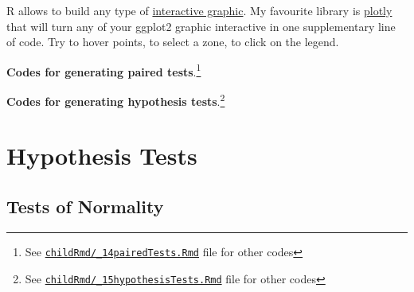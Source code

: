 \documentclass[
]{article}
\newenvironment{Shaded}{\begin{snugshade}}{\end{snugshade}}
\newcommand{\DataTypeTok}[1]{\textcolor[rgb]{0.00,0.34,0.68}{#1}}
\newcommand{\DecValTok}[1]{\textcolor[rgb]{0.69,0.50,0.00}{#1}}
\newcommand{\KeywordTok}[1]{\textcolor[rgb]{0.12,0.11,0.11}{\textbf{#1}}}
\newcommand{\NormalTok}[1]{\textcolor[rgb]{0.12,0.11,0.11}{#1}}
\newcommand{\OperatorTok}[1]{\textcolor[rgb]{0.12,0.11,0.11}{#1}}
\newcommand{\StringTok}[1]{\textcolor[rgb]{0.75,0.01,0.01}{#1}}
\begin{document}
R allows to build any type of
\href{https://www.r-graph-gallery.com/interactive-charts/}{interactive
graphic}. My favourite library is
\href{https://www.r-graph-gallery.com/get-the-best-from-ggplotly/}{plotly}
that will turn any of your ggplot2 graphic interactive in one
supplementary line of code. Try to hover points, to select a zone, to
click on the legend.

\begin{Shaded}
\end{Shaded}

\textbf{Codes for generating paired tests}.\footnote{See
  \href{https://github.com/sbalci/histopathology-template/blob/master/childRmd/_14pairedTests.Rmd}{\texttt{childRmd/\_14pairedTests.Rmd}}
  file for other codes}

\textbf{Codes for generating hypothesis tests}.\footnote{See
  \href{https://github.com/sbalci/histopathology-template/blob/master/childRmd/_15hypothesisTests.Rmd}{\texttt{childRmd/\_15hypothesisTests.Rmd}}
  file for other codes}

\hypertarget{hypothesis-tests}{%
\section{Hypothesis Tests}\label{hypothesis-tests}}

\hypertarget{tests-of-normality}{%
\subsection{Tests of Normality}\label{tests-of-normality}}
\end{document}
